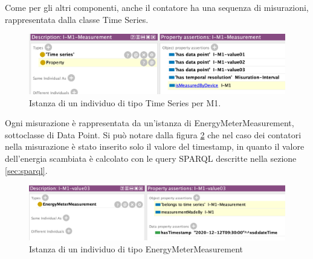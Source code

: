 Come per gli altri componenti, anche il contatore ha una sequenza di misurazioni, rappresentata dalla classe Time Series.

\begin{figure}[H]
    \centering
    \includegraphics[width=12cm]{images/individual_m1meas.png}
    \caption{Istanza di un individuo di tipo Time Series per M1.}
    \label{fig:individual_m1meas}
\end{figure}

Ogni misurazione è rappresentata da un'istanza di EnergyMeterMeasurement, sottoclasse di Data Point. Si può notare dalla figura \ref{fig:individual_m1val3} che nel caso dei contatori nella misurazione è stato inserito solo il valore del timestamp, in quanto il valore dell'energia scambiata è calcolato con le query SPARQL descritte nella sezione \ref{sec:sparql}.

\begin{figure}[H]
    \centering
    \includegraphics[width=12cm]{images/individual_m1val3.png}
    \caption{Istanza di un individuo di tipo EnergyMeterMeasurement}
    \label{fig:individual_m1val3}
\end{figure}